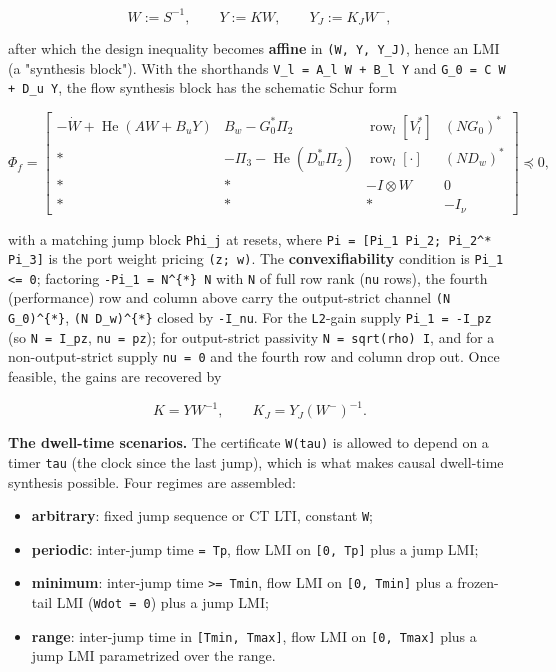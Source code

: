 \documentclass[11pt,oneside]{report}
\newcommand{\code}[1]{\texttt{#1}}
\providecommand{\tightlist}{\setlength{\itemsep}{0pt}\setlength{\parskip}{0pt}}
\begin{document}
\[
W := S^{-1} , \qquad Y := K W , \qquad Y_J := K_J W^{-} ,
\]

after which the design inequality becomes \textbf{affine} in \code{(W, Y, Y\_J)}, hence an
LMI (a "synthesis block"). With the shorthands \code{V\_l = A\_l W + B\_l Y} and
\code{G\_0 = C W + D\_u Y}, the flow synthesis block has the schematic Schur form

\[
\Phi_f =
\begin{bmatrix}
  -\dot W + \operatorname{He}(A W + B_u Y) & B_w - G_0^{*}\Pi_2 & \operatorname{row}_l[V_l^{*}] & (N G_0)^{*} \\
  \ast & -\Pi_3 - \operatorname{He}(D_w^{*}\Pi_2) & \operatorname{row}_l[\cdot] & (N D_w)^{*} \\
  \ast & \ast & -I \otimes W & 0 \\
  \ast & \ast & \ast & -I_\nu
\end{bmatrix} \preceq 0 ,
\]

with a matching jump block \code{Phi\_j} at resets, where \code{Pi = [Pi\_1 Pi\_2; Pi\_2\^{}* Pi\_3]}
is the port weight pricing \code{(z; w)}. The \textbf{convexifiability} condition is
\code{Pi\_1 \textless{}= 0}; factoring \code{-Pi\_1 = N\^{}\{*\} N} with \code{N} of full row rank (\code{nu} rows),
the fourth (performance) row and column above carry the output-strict channel
\code{(N G\_0)\^{}\{*\}}, \code{(N D\_w)\^{}\{*\}} closed by \code{-I\_nu}. For the \code{L2}-gain supply
\code{Pi\_1 = -I\_pz} (so \code{N = I\_pz}, \code{nu = pz}); for output-strict passivity
\code{N = sqrt(rho) I}, and for a non-output-strict supply \code{nu = 0} and the fourth row
and column drop out. Once feasible, the gains are recovered by

\[
K = Y W^{-1} , \qquad K_J = Y_J (W^{-})^{-1} .
\]

\textbf{The dwell-time scenarios.} The certificate \code{W(tau)} is allowed to depend on a
timer \code{tau} (the clock since the last jump), which is what makes causal
dwell-time synthesis possible. Four regimes are assembled:

\begin{itemize}
\tightlist
\item
  \textbf{arbitrary}: fixed jump sequence or CT LTI, constant \code{W};
\item
  \textbf{periodic}: inter-jump time \code{= Tp}, flow LMI on \code{[0, Tp]} plus a jump LMI;
\item
  \textbf{minimum}: inter-jump time \code{\textgreater{}= Tmin}, flow LMI on \code{[0, Tmin]} plus a
  frozen-tail LMI (\code{Wdot = 0}) plus a jump LMI;
\item
  \textbf{range}: inter-jump time in \code{[Tmin, Tmax]}, flow LMI on \code{[0, Tmax]} plus a
  jump LMI parametrized over the range.
\end{itemize}
\end{document}
